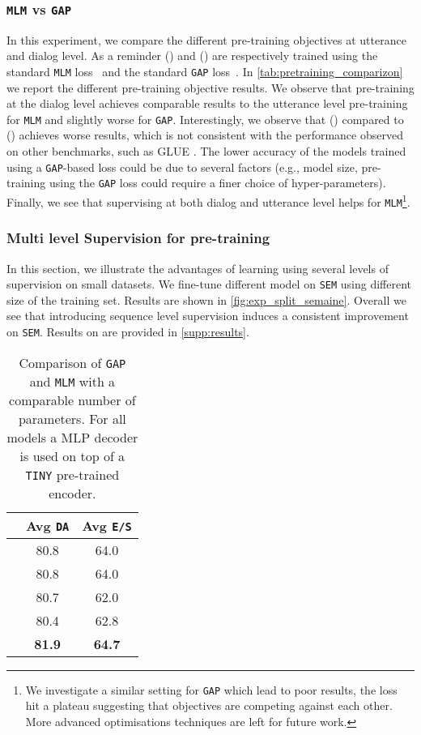 \documentclass[11pt,a4paper]{article}
\begin{document}
\subsubsection{\texttt{MLM} vs \texttt{GAP}} 
In this experiment, we compare the different pre-training objectives at utterance and dialog level.
As a reminder () and () are respectively trained using the standard \texttt{MLM} loss~\cite{bert} and the standard \texttt{GAP} loss~\cite{xlnet}.
In \autoref{tab:pretraining_comparizon} we report the different pre-training objective results.
We observe that pre-training at the dialog level achieves comparable results to the utterance level pre-training for \texttt{MLM} and slightly worse for \texttt{GAP}.
Interestingly, we observe that () compared to  () achieves worse results, which is not consistent with the performance observed on other benchmarks, such as GLUE \cite{glue}.
The lower accuracy of the models trained using a \texttt{GAP}-based loss could be due to several factors (e.g., model size, pre-training using the \texttt{GAP} loss could require a finer choice of hyper-parameters).
Finally, we see that supervising at both dialog and utterance level helps for \texttt{MLM}\footnote{We investigate a similar setting for \texttt{GAP} which lead to poor results, the loss hit a plateau suggesting that objectives are competing against each other. More advanced optimisations techniques \cite{multi_loss_opt} are left for future work.}.
\subsubsection{Multi level Supervision for pre-training}\label{sssec:multi_sup}
In this section, we illustrate the advantages of learning using several levels of supervision on small datasets. We fine-tune different model on \texttt{SEM} using different size of the training set. Results are shown in \autoref{fig:exp_split_semaine}. Overall we see that introducing sequence level supervision induces a consistent improvement on \texttt{SEM}. Results on  are provided in \autoref{supp:results}.
\begin{table}[]
\begin{center}
 \begin{tabular}{ c | c c } 
 \hline
 & Avg \texttt{DA} &   Avg \texttt{E/S} \\ \hline
 & 80.8 & 64.0 \\ & 80.8 & 64.0 \\\hline  & 80.7 & 62.0 \\ & 80.4 & 62.8 \\\hline   & \textbf{81.9} & \textbf{64.7} \\
\end{tabular}
\caption{Comparison of \texttt{GAP} and \texttt{MLM} with a comparable number of parameters. For all models a MLP decoder is used on top of a \texttt{TINY} pre-trained encoder.}
\label{tab:pretraining_comparizon}
\end{center}
\end{table} 
\end{document}
